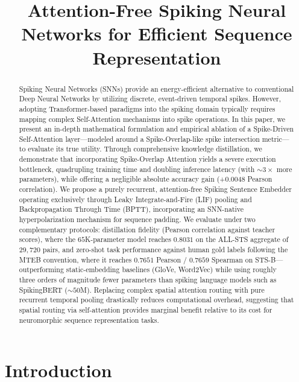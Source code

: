 \documentclass[preprint,12pt]{elsarticle}
\begin{document}
\begin{frontmatter}

\title{Attention-Free Spiking Neural Networks for Efficient Sequence Representation}


\begin{abstract}
Spiking Neural Networks (SNNs) provide an energy-efficient alternative to conventional Deep Neural Networks by utilizing discrete, event-driven temporal spikes. However, adopting Transformer-based paradigms into the spiking domain typically requires mapping complex Self-Attention mechanisms into spike operations. In this paper, we present an in-depth mathematical formulation and empirical ablation of a Spike-Driven Self-Attention layer—modeled around a Spike-Overlap-like spike intersection metric—to evaluate its true utility. Through comprehensive knowledge distillation, we demonstrate that incorporating Spike-Overlap Attention yields a severe execution bottleneck, quadrupling training time and doubling inference latency (with $\sim 3\times$ more parameters), while offering a negligible absolute accuracy gain (+0.0048 Pearson correlation). We propose a purely recurrent, attention-free Spiking Sentence Embedder operating exclusively through Leaky Integrate-and-Fire (LIF) pooling and Backpropagation Through Time (BPTT), incorporating an SNN-native hyperpolarization mechanism for sequence padding. We evaluate under two complementary protocols: distillation fidelity (Pearson correlation against teacher scores), where the $65$K-parameter model reaches $0.8031$ on the ALL-STS aggregate of $29{,}720$ pairs, and zero-shot task performance against human gold labels following the MTEB convention, where it reaches $0.7651$ Pearson / $0.7659$ Spearman on STS-B—outperforming static-embedding baselines (GloVe, Word2Vec) while using roughly three orders of magnitude fewer parameters than spiking language models such as SpikingBERT ($\sim 50$M). Replacing complex spatial attention routing with pure recurrent temporal pooling drastically reduces computational overhead, suggesting that spatial routing via self-attention provides marginal benefit relative to its cost for neuromorphic sequence representation tasks.
\end{abstract}

\end{frontmatter}

\section{Introduction}
\end{document}
